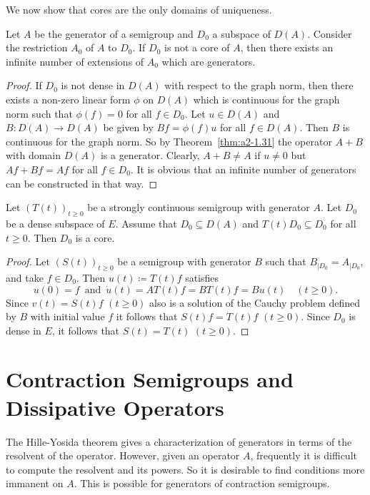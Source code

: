 We now show that cores are the only domains of uniqueness.
\begin{theorem}\label{thm:a2-1.33}
Let $A$ be the generator of a semigroup and $D_{0}$ a subspace of\/ $D(A)$.
Consider the restriction $A_{0}$ of\/ $A$ to $D_{0}$.
If\/ $D_{0}$ is not a core of\/ $A$, then there exists an infinite number of extensions of\/ $A_{0}$ which are generators.
\end{theorem}
\begin{proof}
If\/ $D_{0}$ is not dense in $D(A)$ with respect to the graph norm, then there exists a non-zero linear form $\phi$ on $D(A)$ which is continuous for the graph norm such that $\phi(f) = 0$ for all $f \in D_{0}$. 
Let $u \in D(A)$ and $B \colon D(A) \to D(A)$ be given by $Bf = \phi(f)u$ for all $f \in D(A)$.
Then $B$ is continuous for the graph norm.
So by Theorem~\ref{thm:a2-1.31}   the operator $A+B$ with domain $D(A)$ is a generator.
Clearly, $A+B \neq A$ if\/ $u \neq 0$ but $Af+Bf = Af$ for all $f \in D_{0}$.
It is obvious that an infinite number of generators can be constructed in that way.
\end{proof}
\begin{corollary}\label{cor:a2-1.34}
Let $(T(t))_{t\geq 0}$ be a strongly continuous semigroup with generator $A$.
Let $D_{0}$ be a dense subspace of\/ $E$.
Assume that $D_{0} \subseteq D(A)$ and $T(t)D_{0} \subseteq D_{0}$ for all $t \geq 0$.
Then $D_{0}$ is a core.
\end{corollary}
\begin{proof}
Let $(S(t))_{t\geq 0}$ be a semigroup with generator $B$ such that $B_{\vert D_{0}} = A_{\vert D_{0}}$, and take $f \in D_{0}$.
Then $u(t) \coloneq T(t)f$ satisfies 
\[
u(0) = f\,  \text{ and } \,\dot{u}(t) = AT(t)f = BT(t)f = Bu(t) \quad (t \geq 0).
\]
Since $v(t) = S(t)f$ $(t \geq 0)$ also is a solution of the Cauchy problem defined by $B$ with initial value $f$ it follows that $S(t)f = T(t)f$ $(t\geq 0)$.
Since $D_{0}$ is dense in $E$, it follows that $S(t) = T(t)$ $(t \geq 0)$.
\end{proof}
\section{Contraction Semigroups and Dissipative Operators}\label{sec:a2-2}%
\hspace{1cm}{\Large by Wolfgang Arendt}
\vspace{.5cm}
\newline
The Hille-Yosida theorem gives a characterization of generators in terms of the resolvent of the operator.
However, given an operator $A$, frequently it is difficult to compute the resolvent and its powers.
So it is desirable to find conditions more immanent on $A$.
This is possible for generators of contraction semigroups.

